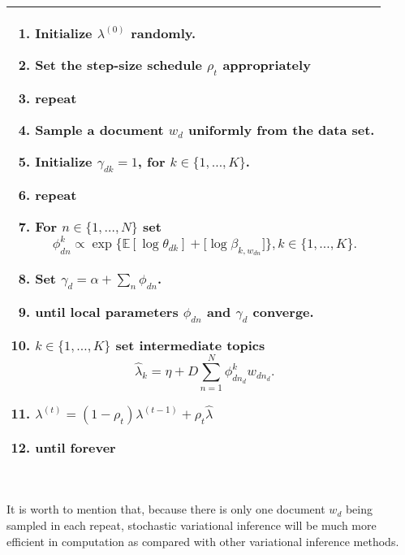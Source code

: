 \documentclass{article}
\begin{document}
\begin{tabular}{|p{12cm}|}
	\hline
	\begin{enumerate}
		\item Initialize $\lambda^{(0)}$ randomly.
		\item Set the step-size schedule $\rho_t$ appropriately
		\item \textbf{repeat}
		\item \hspace{1ex} Sample a document $w_d$ uniformly from the data set.
		\item \hspace{1ex} Initialize $\gamma_{dk}=1$, for $k\in\{1, \dots,K\}$.
		\item \hspace{1ex} \textbf{repeat}
		\item \hspace{3ex} For $n \in \{1,\dots, N\}$ set $$\phi_{dn}^k \propto \exp\{\mathbb{E}[\log\theta_{dk}] + \mathbb[\log \beta_{k,w_{dn}}]\}, k\in \{1,\dots,K\}.$$
		\item \hspace{3ex} Set $\gamma_d=\alpha+\sum_{n}\phi_{dn}$.
		\item \hspace{3ex} \textbf{until} local parameters $\phi_{dn}$ and $\gamma_d$ converge.
		\item \hspace{3ex} $k\in\{1,\dots,K\}$ set intermediate topics $$\hat{\lambda}_k=\eta+D\sum_{n=1}^N \phi_{dn_d}^k w_{dn_d}.$$
		\item \hspace{3ex} $\lambda^{(t)}=(1-\rho_t)\lambda^{(t-1)}+\rho_t \hat{\lambda}$
		\item \hspace{3ex} \textbf{until} forever
	\end{enumerate}\\
	\hline
\end{tabular}
\\
It is worth to mention that, because there is only one document $w_d$ being sampled in each repeat, stochastic variational inference will be much more efficient in computation as compared with other variational inference methods. 
\end{document}
